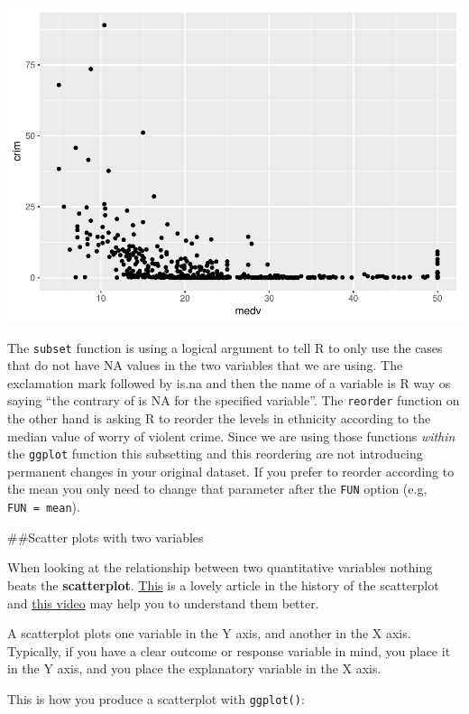 \documentclass[]{book}
\theoremstyle{definition}
\theoremstyle{definition}
\theoremstyle{definition}
\theoremstyle{remark}
\begin{document}
\includegraphics{03-visualisation_files/figure-latex/unnamed-chunk-34-1.pdf}

The \texttt{subset} function is using a logical argument to tell R to
only use the cases that do not have NA values in the two variables that
we are using. The exclamation mark followed by is.na and then the name
of a variable is R way os saying ``the contrary of is NA for the
specified variable''. The \texttt{reorder} function on the other hand is
asking R to reorder the levels in ethnicity according to the median
value of worry of violent crime. Since we are using those functions
\emph{within} the \texttt{ggplot} function this subsetting and this
reordering are not introducing permanent changes in your original
dataset. If you prefer to reorder according to the mean you only need to
change that parameter after the \texttt{FUN} option (e.g,
\texttt{FUN\ =\ mean}).

\#\#Scatter plots with two variables

When looking at the relationship between two quantitative variables
nothing beats the \textbf{scatterplot}.
\href{http://www.datavis.ca/papers/friendly-scat.pdf}{This} is a lovely
article in the history of the scatterplot and
\href{http://www.learner.org/courses/againstallodds/unitpages/unit10.html}{this
video} may help you to understand them better.

A scatterplot plots one variable in the Y axis, and another in the X
axis. Typically, if you have a clear outcome or response variable in
mind, you place it in the Y axis, and you place the explanatory variable
in the X axis.

This is how you produce a scatterplot with \texttt{ggplot()}:
\end{document}
